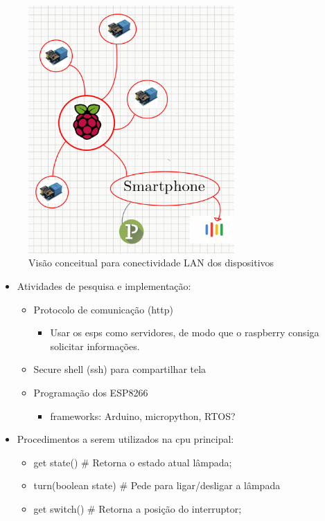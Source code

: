 \documentclass[11pt]{article}
\begin{document}
\begin{figure}[h!]
\caption{\label{fig:lan_concept}Visão conceitual para conectividade LAN dos dispositivos}
\centering
\includegraphics[width=0.7\textwidth]{./lan_concept.png}
\end{figure}

\begin{itemize}
\item Atividades de pesquisa e implementação:
\begin{itemize}
\item Protocolo de comunicação (http)
\begin{itemize}
\item Usar os esps como servidores, de modo que o raspberry consiga solicitar informações.
\end{itemize}
\item Secure shell (ssh) para compartilhar tela
\item Programação dos ESP8266
\begin{itemize}
\item frameworks: Arduino, micropython, RTOS?
\end{itemize}
\end{itemize}
\item Procedimentos a serem utilizados na cpu principal:
\begin{itemize}
\item get state() \# Retorna o estado atual lâmpada;
\item turn(boolean state) \# Pede para ligar/desligar a lâmpada
\item get switch() \# Retorna a posição do interruptor;
\end{itemize}
\end{itemize}
\end{document}
